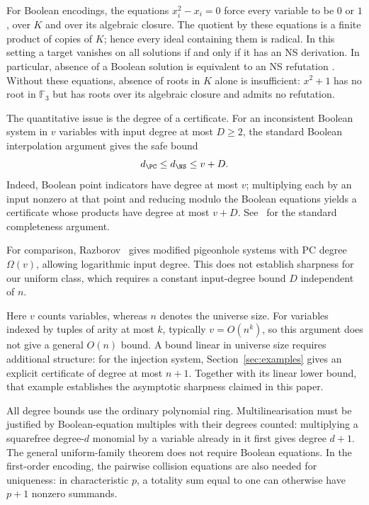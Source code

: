 For Boolean encodings, the equations $x_i^2-x_i=0$ force every variable
to be $0$ or $1$, over $K$ and over its algebraic closure. The quotient
by these equations is a finite product of copies of $K$; hence every
ideal containing them is radical. In this setting a target vanishes
on all solutions if and only if it has an NS derivation. In particular,
absence of a Boolean solution is equivalent to an NS refutation
\cite{NSFoundations}. Without these equations, absence of roots in $K$
alone is insufficient: $x^2+1$ has no root in $\mathbb F_3$ but has
roots over its algebraic closure and admits no refutation.

The quantitative issue is the degree of a certificate. For an
inconsistent Boolean system in $v$ variables with input degree at most
$D\ge2$, the standard Boolean interpolation argument gives the safe bound
\begin{equation}\label{eq:booleancomplete}
                 d_{\PC}\le d_{\NS}\le v+D.
\end{equation}
Indeed, Boolean point indicators have degree at most $v$; multiplying
each by an input nonzero at that point and reducing modulo the Boolean
equations yields a certificate whose products have degree at most
$v+D$. See~\cite{NSFoundations} for the standard completeness argument.

For comparison, Razborov~\cite{RazborovPC} gives modified pigeonhole
systems with PC degree $\Omega(v)$, allowing logarithmic input degree.
This does not establish sharpness for our uniform class, which requires
a constant input-degree bound $D$ independent of $n$.

Here $v$ counts variables, whereas $n$ denotes the universe size. For
variables indexed by tuples of arity at most $k$, typically $v=O(n^k)$,
so this argument does not give a general $O(n)$ bound. A bound linear
in universe size requires additional structure: for the injection
system, Section~\ref{sec:examples} gives an explicit certificate of
degree at most $n+1$. Together with its linear lower bound, that
example establishes the asymptotic sharpness claimed in this paper.

All degree bounds use the ordinary polynomial ring. Multilinearisation
must be justified by Boolean-equation multiples with their degrees
counted: multiplying a squarefree degree-$d$ monomial by a variable
already in it first gives degree $d+1$. The general uniform-family
theorem does not require Boolean equations. In the first-order
encoding, the pairwise collision equations are also needed for
uniqueness: in characteristic $p$, a totality sum equal to one can
otherwise have $p+1$ nonzero summands.

